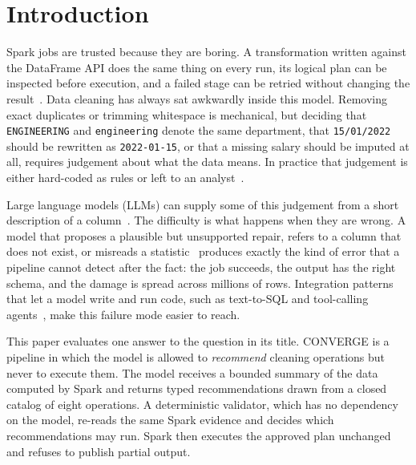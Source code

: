 \section{Introduction}
\label{sec:intro}
Spark jobs are trusted because they are boring. A transformation written against the DataFrame API does the same thing on every run, its logical plan can be inspected before execution, and a failed stage can be retried without changing the result~\cite{zaharia2012rdd,zaharia2016spark,armbrust2015sparksql}. Data cleaning has always sat awkwardly inside this model. Removing exact duplicates or trimming whitespace is mechanical, but deciding that \texttt{ENGINEERING} and \texttt{engineering} denote the same department, that \texttt{15/01/2022} should be rewritten as \texttt{2022-01-15}, or that a missing salary should be imputed at all, requires judgement about what the data means. In practice that judgement is either hard-coded as rules or left to an analyst~\cite{rahm2000cleaning,chu2016cleaning,ilyas2019cleaning}.

Large language models (LLMs) can supply some of this judgement from a short description of a column~\cite{narayan2022foundation,zhang2023preprocessors}. The difficulty is what happens when they are wrong. A model that proposes a plausible but unsupported repair, refers to a column that does not exist, or misreads a statistic~\cite{ji2023hallucination,huang2025hallucination} produces exactly the kind of error that a pipeline cannot detect after the fact: the job succeeds, the output has the right schema, and the damage is spread across millions of rows. Integration patterns that let a model write and run code, such as text-to-SQL and tool-calling agents~\cite{rajkumar2022texttosql,li2023bird,yao2023react,schick2023toolformer}, make this failure mode easier to reach.

This paper evaluates one answer to the question in its title. CONVERGE is a pipeline in which the model is allowed to \emph{recommend} cleaning operations but never to execute them. The model receives a bounded summary of the data computed by Spark and returns typed recommendations drawn from a closed catalog of eight operations. A deterministic validator, which has no dependency on the model, re-reads the same Spark evidence and decides which recommendations may run. Spark then executes the approved plan unchanged and refuses to publish partial output.

